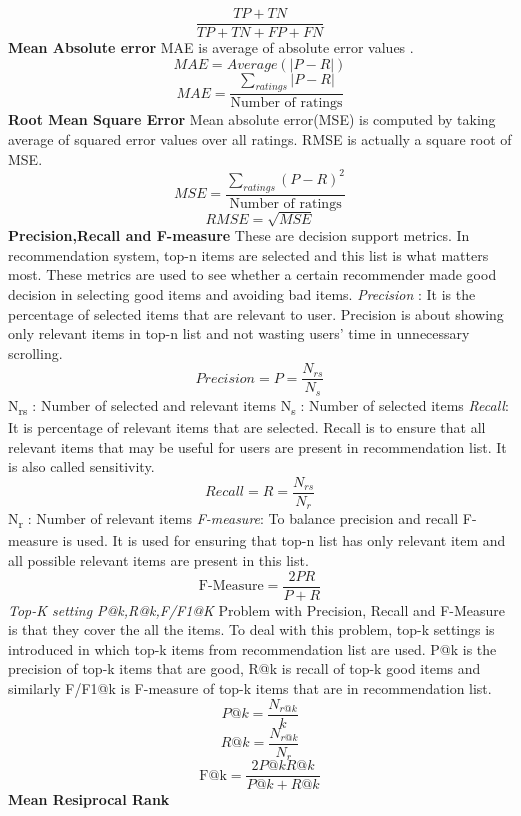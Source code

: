 \[\frac{TP+TN}{TP+TN+FP+FN}\]
\newline
\textbf{Mean Absolute error}
MAE is average of absolute error values \cite{Metrics2}. 
\[ MAE = Average(|P-R|)\]
\[MAE = \frac{\sum_{ratings} |P-R|}{\textrm{Number of ratings}} \]
\newline
\textbf{Root Mean Square Error}
Mean absolute error(MSE) is computed by taking average of squared error values over all ratings. RMSE is actually a square root of MSE\cite{Metrics2}.
\[MSE = \frac{\sum_{ratings} (P-R)^{2}}{\textrm{Number of ratings}} \]
\[RMSE = \sqrt{MSE} \]
\newline
\textbf{Precision,Recall and F-measure}
These are decision support metrics. In recommendation system, top-n items are selected and this list is what matters most. These metrics are used to see whether a certain recommender made good decision in selecting good items and avoiding bad items. 
\newline
\textit{Precision} : It is the percentage of selected items that are relevant to user\cite{Metrics2}. Precision is about showing only relevant items in top-n list and not wasting users' time in unnecessary scrolling.
\[Precision = P = \frac{N_{rs}}{N_s} \]
N\textsubscript{rs} : Number of selected and relevant items\newline
N\textsubscript{s} : Number of selected items
\newline
\textit{Recall}: It is percentage of relevant items that are selected\cite{Metrics2}. Recall is to ensure that all relevant items that may be useful for users are present in recommendation list. It is also called sensitivity.
\[Recall = R = \frac{N_{rs}}{N_r} \]
N\textsubscript{r} : Number of relevant items
\newline
\textit{F-measure}: To balance precision and recall F-measure is used. It is used for ensuring that top-n list has only relevant item and all possible relevant items are present in this list\cite{Metrics2}. 
\[\textrm{F-Measure} = \frac{2PR}{P+R} \]
\textit{Top-K setting P@k,R@k,F/F1@K} 
Problem with Precision, Recall and F-Measure is that they cover the all the items. To deal with this problem, top-k settings is introduced in which top-k items from recommendation list are used. P@k is the precision of top-k items that are good, R@k is recall of top-k good items and similarly F/F1@k is F-measure of top-k items that are in recommendation list. 
\[P@k = \frac{N_{r@k}}{k} \]
\[R@k = \frac{N_{r@k}}{N_r} \]
\[\textrm{F@k} = \frac{2P@k R@k}{P@k+R@k} \]
\newline
\textbf{Mean Resiprocal Rank}
